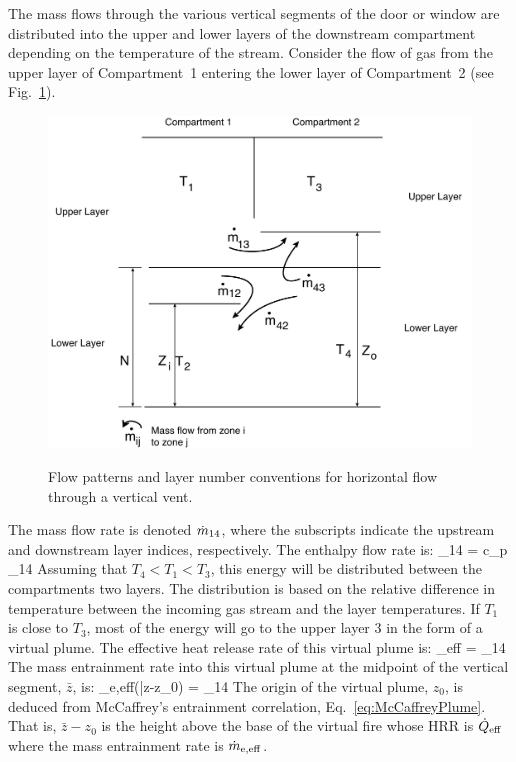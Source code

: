 The mass flows through the various vertical segments of the door or window are distributed into the upper and lower layers of the downstream compartment depending on the temperature of the stream. Consider the flow of gas from the upper layer of Compartment~1 entering the lower layer of Compartment~2 (see Fig.~\ref{fig:Flow_Patterns}).
\begin{figure}[t]
\begin{center}
\includegraphics[width=5.0in]{FIGURES/Theory/Flow_Patterns}\\
\end{center}
\caption{Flow patterns and layer number conventions for horizontal flow through a vertical vent.}
 \label{fig:Flow_Patterns}
\end{figure}
The mass flow rate is denoted $\dot{m}_{14}$, where the subscripts indicate the upstream and downstream layer indices, respectively. The enthalpy flow rate is:
\be
   \doh_{14} = c_p  \dm_{14}
\ee
Assuming that $T_4 < T_1 < T_3$, this energy will be distributed between the compartments two layers. The distribution is based on the relative difference in temperature between the incoming gas stream and the layer temperatures. If $T_1$ is close to $T_3$, most of the energy will go to the upper layer 3 in the form of a virtual plume. The effective heat release rate of this virtual plume is:
\be
   \dQ_{\rm eff} =  \; \doh_{14}
\ee
The mass entrainment rate into this virtual plume at the midpoint of the vertical segment, $\bar{z}$, is:
\be
   \dm_{\rm e,eff}(\bar{z}-z_0) =  \; \dm_{14}
\ee
The origin of the virtual plume, $z_0$, is deduced from McCaffrey's entrainment correlation, Eq.~\ref{eq:McCaffreyPlume}. That is, $\bar{z}-z_0$ is the height above the base of the virtual fire whose HRR is $\dot{Q}_{\rm eff}$ where the mass entrainment rate is $\dot{m}_{\rm e,eff}$.

